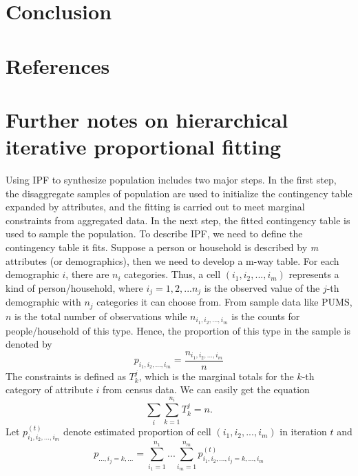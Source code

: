 \documentclass[11pt,twoside]{article}
\numberwithin{equation}{section}
\newcommand{\?}{\stackrel{?}{=}}
\begin{document}
\section{Conclusion}
\section{References}
\printbibliography

\appendix
\section{Further notes on hierarchical iterative proportional fitting}
Using IPF to synthesize population includes two major steps.
In the first step, the disaggregate samples of population are used to initialize the contingency table expanded by attributes, and the fitting is carried out to meet marginal constraints from aggregated data.
In the next step, the fitted contingency table is used to sample the population.
To describe IPF, we need to define the contingency table it fits.
Suppose a person or household is described by \textit{m} attributes (or demographics), then we need to develop a m-way table.
For each demographic $i$, there are $n_i$ categories.
Thus, a cell $(i_1, i_2,..., i_m)$ represents a kind of person/household, where $i_j = 1,2,...n_j$ is the observed value of the $j$-th demographic with $n_j$ categories it can choose from.
From sample data like PUMS, $n$ is the total number of observations while $n_{i_1, i_2,...,i_m}$ is the counts for people/household of this type.
Hence, the proportion of this type in the sample is denoted by
\begin{equation}
  \label{eqn:prop}
   p_{i_1,i_2,...,i_m} = \frac{n_{i_1, i_2,...,i_m}}{n}
\end{equation}
The constraints is defined as $T_k^j$, which is the marginal totals for the $k$-th category of attribute $i$ from census data.
We can easily get the equation
\begin{equation}
  \label{eq:2}
\sum_i\sum_{k=1}^{n_i}T_k^j=n.  
\end{equation}
Let $p_{i_1,i_2,...,i_m}^{(t)}$ denote estimated proportion of cell $(i_1, i_2,..., i_m)$ in iteration $t$ and
\begin{equation}
  \label{eq:3}
  p_{...,i_j=k,...} = \sum_{i_1=1}^{n_1}...\sum_{i_m=1}^{n_m}p_{i_1,i_2,...,i_j=k,...,i_m}^{(t)}  
\end{equation}
\end{document}
